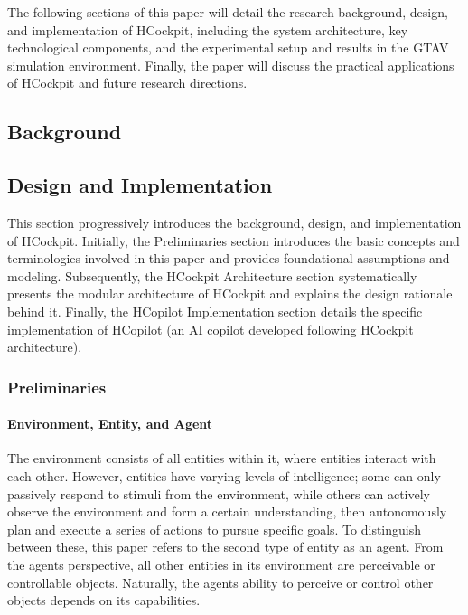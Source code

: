 \documentclass[
]{article}
\begin{document}
The following sections of this paper will detail the research
background, design, and implementation of HCockpit, including the system
architecture, key technological components, and the experimental setup
and results in the GTAV simulation environment. Finally, the paper will
discuss the practical applications of HCockpit and future research
directions.

\subsection{Background}\label{background}

\subsection{Design and Implementation}\label{design-and-implementation}

This section progressively introduces the background, design, and
implementation of HCockpit. Initially, the Preliminaries section
introduces the basic concepts and terminologies involved in this paper
and provides foundational assumptions and modeling. Subsequently, the
HCockpit Architecture section systematically presents the modular
architecture of HCockpit and explains the design rationale behind it.
Finally, the HCopilot Implementation section details the specific
implementation of HCopilot (an AI copilot developed following HCockpit
architecture).

\subsubsection{Preliminaries}\label{preliminaries}

\paragraph{Environment, Entity, and
Agent}\label{environment-entity-and-agent}

The environment consists of all entities within it, where entities
interact with each other. However, entities have varying levels of
intelligence; some can only passively respond to stimuli from the
environment, while others can actively observe the environment and form
a certain understanding, then autonomously plan and execute a series of
actions to pursue specific goals. To distinguish between these, this
paper refers to the second type of entity as an agent. From the
agent\textquotesingle s perspective, all other entities in its
environment are perceivable or controllable objects. Naturally, the
agent\textquotesingle s ability to perceive or control other objects
depends on its capabilities.
\end{document}
